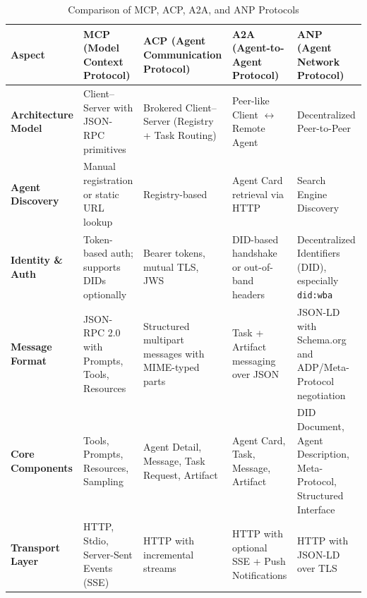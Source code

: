 \documentclass{article}
\begin{document}
\begin{table}[h]
    \small
  \centering
  \renewcommand{\arraystretch}{1.2}
  \caption{Comparison of MCP, ACP, A2A, and ANP Protocols}
  \captionsetup{justification=centering}
  \label{tab:agent-protocol-comparison}
  \begin{tabularx}{\textwidth}{|
      >{\raggedright\arraybackslash}p{2.2cm}|
      >{\raggedright\arraybackslash}X|
      >{\raggedright\arraybackslash}X|
      >{\raggedright\arraybackslash}X|
      >{\raggedright\arraybackslash}X|
  }
    \toprule
    \rowcolor{gray!25}
    \textbf{Aspect} &
    \textbf{MCP (Model Context Protocol)} &
    \textbf{ACP (Agent Communication Protocol)} &
    \textbf{A2A (Agent-to-Agent Protocol)} &
    \textbf{ANP (Agent Network Protocol)} \\
    \midrule

    \textbf{Architecture Model} &
    Client–Server with JSON-RPC primitives &
    Brokered Client–Server (Registry + Task Routing) &
     Peer-like Client $\leftrightarrow$ Remote Agent
&
    Decentralized Peer-to-Peer \\

    \textbf{Agent Discovery} &
    Manual registration or static URL lookup &
    Registry-based   &
    Agent Card retrieval via HTTP &
    Search Engine Discovery \\

    \textbf{Identity \& Auth} &
    Token-based auth; supports DIDs optionally &
    Bearer tokens, mutual TLS, JWS &
    DID-based handshake or out-of-band headers &
    Decentralized Identifiers (DID), especially \texttt{did:wba} \\

    \textbf{Message Format} &
    JSON-RPC 2.0 with Prompts, Tools, Resources &
    Structured multipart messages with MIME-typed parts &
    Task + Artifact messaging over JSON &
    JSON-LD with Schema.org and ADP/Meta-Protocol negotiation \\

    \textbf{Core Components} &
    Tools, Prompts, Resources, Sampling &
    Agent Detail, Message, Task Request, Artifact &
    Agent Card, Task, Message, Artifact &
    DID Document, Agent Description, Meta-Protocol, Structured Interface \\

    \textbf{Transport Layer} &
    HTTP, Stdio, Server-Sent Events (SSE) &
    HTTP with incremental streams &
    HTTP with optional SSE + Push Notifications &
    HTTP with JSON-LD over TLS \\


\end{tabularx}
\end{table}
\end{document}
